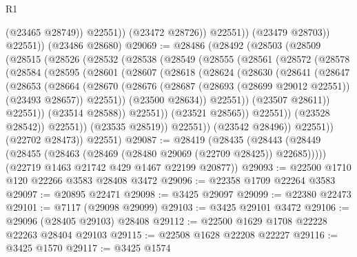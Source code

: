 \begin{lexlean}{R1}
\begin{coremodule}
                      (@23465 @28749))
                    @22551))
                (@23472 @28726))
              @22551))
          (@23479 @28703))
        @22551))
    (@23486 @28680)
@29069 := @28486
    (@28492
      (@28503
        (@28509
          (@28515
            (@28526
              (@28532
                (@28538
                  (@28549
                    (@28555
                      (@28561
                        (@28572
                          (@28578
                            (@28584
                              (@28595
                                (@28601
                                  (@28607
                                    (@28618
                                      (@28624
                                        (@28630
                                          (@28641
                                            (@28647
                                              (@28653
                                                (@28664
                                                  (@28670
                                                    (@28676
                                                      (@28687
                                                        (@28693 (@28699 @29012 @22551))
                                                        (@23493 @28657))
                                                      @22551))
                                                  (@23500 @28634))
                                                @22551))
                                            (@23507 @28611))
                                          @22551))
                                      (@23514 @28588))
                                    @22551))
                                (@23521 @28565))
                              @22551))
                          (@23528 @28542))
                        @22551))
                    (@23535 @28519))
                  @22551))
              (@23542 @28496))
            @22551))
        (@22702 @28473))
      @22551)
@29087 := @28419
    (@28435
      (@28443 (@28449 (@28455 (@28463 (@28469 (@28480 @29069 (@22709 @28425)) @22685)))))
      (@22719 @1463 @21742 @429 @1467 @22199 @20877))
@29093 := @22500 @1710 @120 @22266 @3583 @28408 @3472
@29096 := @22358 @1709 @22264 @3583
@29097 := @20895 @22471
@29098 := @3425 @29097
@29099 := @22380 @22473
@29101 := @7117 (@29098 @29099)
@29103 := @3425 @29101 @3472
@29106 := @29096 (@28405 @29103) @28408
@29112 := @22500 @1629 @1708 @22228 @22263 @28404 @29103
@29115 := @22508 @1628 @22208 @22227
@29116 := @3425 @1570
@29117 := @3425 @1574

\end{coremodule}
\end{lexlean}
